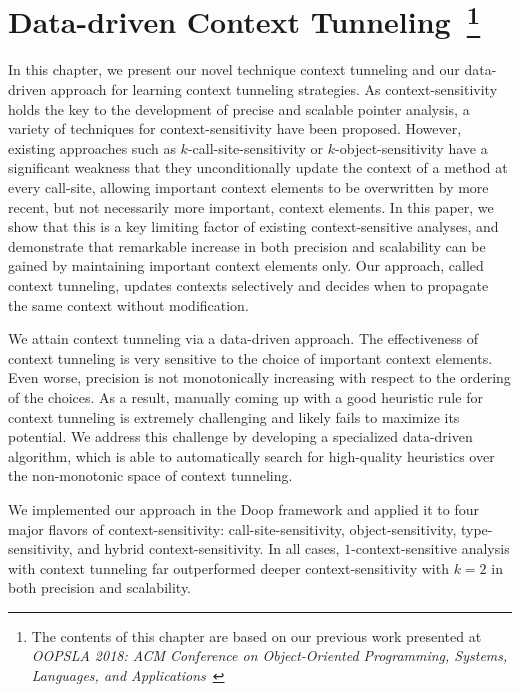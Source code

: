 \chapter{Data-driven Context Tunneling~\footnote{The contents of this chapter are based on our previous work presented at \emph{OOPSLA 2018: ACM Conference on Object-Oriented Programming, Systems, Languages, and Applications}~\cite{JeJeOh18}}}\label{sec:Tunneling}
  In this chapter, we present our novel technique context tunneling and our data-driven approach for learning context tunneling strategies.
  As context-sensitivity holds the key to the development
  of precise and scalable pointer analysis, a variety of techniques
  for context-sensitivity have been proposed. However, existing
  approaches such as $k$-call-site-sensitivity or $k$-object-sensitivity have a
  significant weakness that they unconditionally update the context of a
  method at every call-site, allowing important context elements to be
  overwritten by more recent, but not necessarily more important,
  context elements. In this paper, we show that this is a key limiting factor of
  existing context-sensitive analyses, and demonstrate that remarkable increase in
  both precision and scalability can be gained by
  maintaining important context elements only.
  Our approach, called context tunneling, updates contexts selectively
  and decides when to propagate the same context without
  modification.



  We attain context tunneling via a data-driven approach.  The
  effectiveness of context tunneling is very sensitive to the choice
  of important context elements. Even worse, precision is not
  monotonically increasing with respect to the ordering of the
  choices. As a result, manually coming up with a good heuristic rule
  for context tunneling is extremely challenging and likely fails to
  maximize its potential. We address this challenge by developing a
  specialized data-driven algorithm, which is able to automatically
  search for high-quality heuristics over the non-monotonic space of
  context tunneling.

  We implemented our approach in the Doop framework and applied it to
  four major flavors of context-sensitivity: call-site-sensitivity,
  object-sensitivity, type-sensitivity, and hybrid context-sensitivity. In
  all cases, $1$-context-sensitive analysis with context
  tunneling far outperformed deeper context-sensitivity with $k=2$ in
  both precision and scalability.


